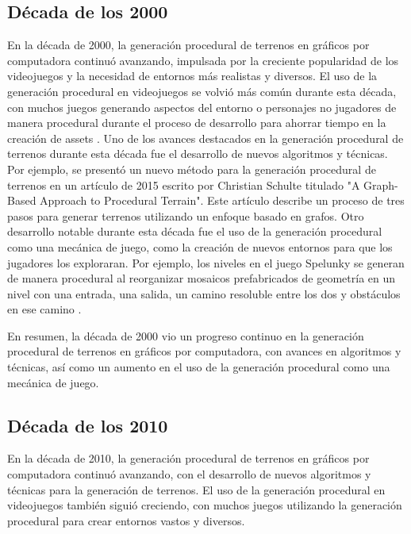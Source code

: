 \subsection{Década de los 2000}

En la década de 2000, la generación procedural de terrenos en gráficos por computadora continuó avanzando, impulsada por la creciente popularidad de los videojuegos y la necesidad de entornos más realistas y diversos. El uso de la generación procedural en videojuegos se volvió más común durante esta década, con muchos juegos generando aspectos del entorno o personajes no jugadores de manera procedural durante el proceso de desarrollo para ahorrar tiempo en la creación de assets \cite{TexturingModelingProcAproach}. Uno de los avances destacados en la generación procedural de terrenos durante esta década fue el desarrollo de nuevos algoritmos y técnicas. Por ejemplo, se presentó un nuevo método para la generación procedural de terrenos en un artículo de 2015 escrito por Christian Schulte titulado "A Graph-Based Approach to Procedural Terrain". Este artículo describe un proceso de tres pasos para generar terrenos utilizando un enfoque basado en grafos. Otro desarrollo notable durante esta década fue el uso de la generación procedural como una mecánica de juego, como la creación de nuevos entornos para que los jugadores los exploraran. Por ejemplo, los niveles en el juego Spelunky se generan de manera procedural al reorganizar mosaicos prefabricados de geometría en un nivel con una entrada, una salida, un camino resoluble entre los dos y obstáculos en ese camino \cite{ProceduralTerrainAproach}.

En resumen, la década de 2000 vio un progreso continuo en la generación procedural de terrenos en gráficos por computadora, con avances en algoritmos y técnicas, así como un aumento en el uso de la generación procedural como una mecánica de juego.

\subsection{Década de los 2010}

En la década de 2010, la generación procedural de terrenos en gráficos por computadora continuó avanzando, con el desarrollo de nuevos algoritmos y técnicas para la generación de terrenos. El uso de la generación procedural en videojuegos también siguió creciendo, con muchos juegos utilizando la generación procedural para crear entornos vastos y diversos.

